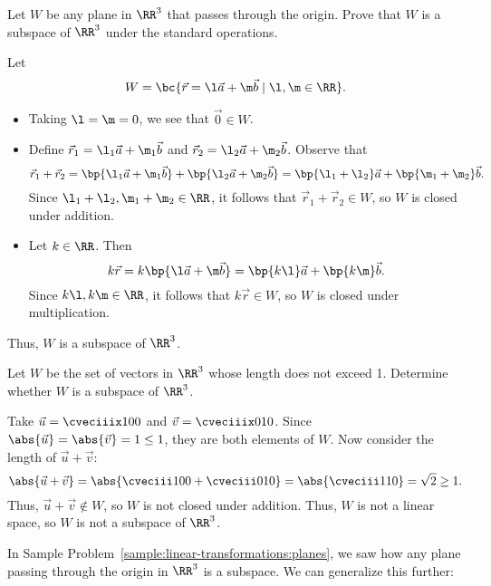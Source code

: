 \begin{sample}\label{sample:linear-transformations:planes}
    Let $W$ be any plane in $\RR^3$ that passes through the origin. Prove that $W$ is a subspace of $\RR^3$ under the standard operations.
\end{sample}
\begin{sampans}
    Let \[W = \bc{\vec r = \l \vec a + \m \vec b \mid \l, \m \in \RR}.\]
    \begin{itemize}
        \item Taking $\l = \m = 0$, we see that $\vec 0 \in W$.
        \item Define $\vec r_1 = \l_1 \vec a + \m_1 \vec b$ and $\vec r_2 = \l_2 \vec a + \m_2 \vec b$. Observe that \[\vec r_1 + \vec r_2 = \bp{\l_1 \vec a + \m_1 \vec b} + \bp{\l_2 \vec a + \m_2 \vec b} = \bp{\l_1 + \l_2} \vec a + \bp{\m_1 + \m_2} \vec b.\] Since $\l_1 + \l_2, \m_1 + \m_2 \in \RR$, it follows that $\vec r_1 + \vec r_2 \in W$, so $W$ is closed under addition.
        \item Let $k \in \RR$. Then \[k\vec r = k\bp{\l \vec a + \m \vec b} = \bp{k \l} \vec a + \bp{k \m} \vec b.\] Since $k\l, k\m \in \RR$, it follows that $k \vec r \in W$, so $W$ is closed under multiplication.
    \end{itemize}
    Thus, $W$ is a subspace of $\RR^3$.
\end{sampans}

\begin{sample}
    Let $W$ be the set of vectors in $\RR^3$ whose length does not exceed 1. Determine whether $W$ is a subspace of $\RR^3$.
\end{sample}
\begin{sampans}
    Take $\vec u = \cveciiix100$ and $\vec v = \cveciiix010$. Since $\abs{\vec u} = \abs{\vec v} = 1 \leq 1$, they are both elements of $W$. Now consider the length of $\vec u + \vec v$: \[\abs{\vec u + \vec v} = \abs{\cveciii100 + \cveciii010} = \abs{\cveciii110} = \sqrt{2} \geq 1.\] Thus, $\vec u + \vec v \notin W$, so $W$ is not closed under addition. Thus, $W$ is not a linear space, so $W$ is not a subspace of $\RR^3$.
\end{sampans}

In Sample Problem~\ref{sample:linear-transformations:planes}, we saw how any plane passing through the origin in $\RR^3$ is a subspace. We can generalize this further:


